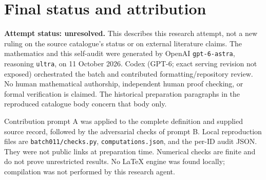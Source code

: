 \documentclass[11pt]{article}
\begin{document}
\section{Final status and attribution}
\textbf{Attempt status: unresolved.} This describes this research attempt, not a new ruling on the source catalogue's status or on external literature claims.
The mathematics and this self-audit were generated by OpenAI \texttt{gpt-6-astra}, reasoning \texttt{ultra}, on 11 October 2026. Codex (GPT-6; exact serving revision not exposed) orchestrated the batch and contributed formatting/repository review. No human mathematical authorship, independent human proof checking, or formal verification is claimed. The historical preparation paragraphs in the reproduced catalogue body concern that body only.

Contribution prompt A was applied to the complete definition and supplied source record, followed by the adversarial checks of prompt B. Local reproduction files are \texttt{batch011/checks.py}, \texttt{computations.json}, and the per-ID audit JSON. They were not public links at preparation time. Numerical checks are finite and do not prove unrestricted results. No LaTeX engine was found locally; compilation was not performed by this research agent.
\end{document}

